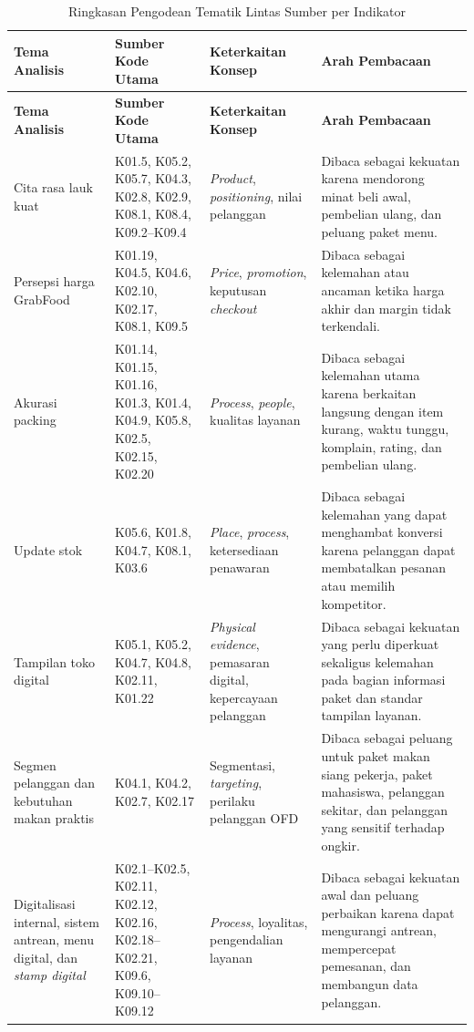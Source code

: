 \begingroup
\scriptsize
\begin{xltabular}{\textwidth}{|L{2.7cm}|Y|L{2.75cm}|L{3.25cm}|}
\caption{Ringkasan Pengodean Tematik Lintas Sumber per Indikator}
\label{tab:pengodean-tematik-lintas-sumber-lampiran}\\
\toprule
\textbf{Tema Analisis} & \textbf{Sumber Kode Utama} & \textbf{Keterkaitan Konsep} & \textbf{Arah Pembacaan} \\ \hline
\midrule
\endfirsthead
{}
\toprule
\textbf{Tema Analisis} & \textbf{Sumber Kode Utama} & \textbf{Keterkaitan Konsep} & \textbf{Arah Pembacaan} \\ \hline
\midrule
\endhead
{}
\endfoot
\bottomrule
\endlastfoot
Cita rasa lauk kuat & K01.5, K05.2, K05.7, K04.3, K02.8, K02.9, K08.1, K08.4, K09.2--K09.4 & \textit{Product}, \textit{positioning}, nilai pelanggan & Dibaca sebagai kekuatan karena mendorong minat beli awal, pembelian ulang, dan peluang paket menu. \\ \hline
Persepsi harga GrabFood & K01.19, K04.5, K04.6, K02.10, K02.17, K08.1, K09.5 & \textit{Price}, \textit{promotion}, keputusan \textit{checkout} & Dibaca sebagai kelemahan atau ancaman ketika harga akhir dan margin tidak terkendali. \\ \hline
Akurasi packing & K01.14, K01.15, K01.16, K01.3, K01.4, K04.9, K05.8, K02.5, K02.15, K02.20 & \textit{Process}, \textit{people}, kualitas layanan & Dibaca sebagai kelemahan utama karena berkaitan langsung dengan item kurang, waktu tunggu, komplain, rating, dan pembelian ulang. \\ \hline
Update stok & K05.6, K01.8, K04.7, K08.1, K03.6 & \textit{Place}, \textit{process}, ketersediaan penawaran & Dibaca sebagai kelemahan yang dapat menghambat konversi karena pelanggan dapat membatalkan pesanan atau memilih kompetitor. \\ \hline
Tampilan toko digital & K05.1, K05.2, K04.7, K04.8, K02.11, K01.22 & \textit{Physical evidence}, pemasaran digital, kepercayaan pelanggan & Dibaca sebagai kekuatan yang perlu diperkuat sekaligus kelemahan pada bagian informasi paket dan standar tampilan layanan. \\ \hline
Segmen pelanggan dan kebutuhan makan praktis & K04.1, K04.2, K02.7, K02.17 & Segmentasi, \textit{targeting}, perilaku pelanggan OFD & Dibaca sebagai peluang untuk paket makan siang pekerja, paket mahasiswa, pelanggan sekitar, dan pelanggan yang sensitif terhadap ongkir. \\ \hline
Digitalisasi internal, sistem antrean, menu digital, dan \textit{stamp digital} & K02.1--K02.5, K02.11, K02.12, K02.16, K02.18--K02.21, K09.6, K09.10--K09.12 & \textit{Process}, loyalitas, pengendalian layanan & Dibaca sebagai kekuatan awal dan peluang perbaikan karena dapat mengurangi antrean, mempercepat pemesanan, dan membangun data pelanggan. \\ \hline

\end{xltabular}
